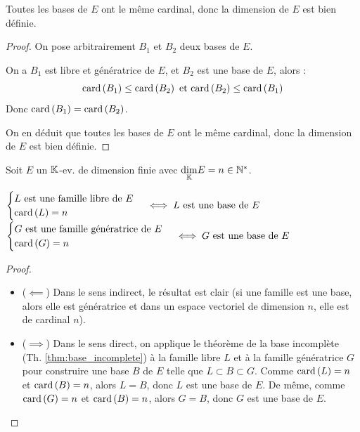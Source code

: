 \documentclass[12pt,a4paper]{report}
\begin{document}
\begin{theorem}
    Toutes les bases de $E$ ont le même cardinal, donc la dimension de $E$ est bien définie.
\end{theorem}

\begin{proof}
    On pose arbitrairement $B_1$ et $B_2$ deux bases de $E$.
    \begin{outline}
        \1 On a $B_1$ est libre et génératrice de $E$, et $B_2$ est une base de $E$, alors :
        $$\mathrm{card}\left(B_1\right) \le \mathrm{card}\left(B_2\right) \text{ et } \mathrm{card}\left(B_2\right) \le \mathrm{card}\left(B_1\right)$$
        \1 Donc $\mathrm{card}\left(B_1\right) = \mathrm{card}\left(B_2\right)$.
    \end{outline}
    On en déduit que toutes les bases de $E$ ont le même cardinal, donc la dimension de $E$ est bien définie.
\end{proof}

\begin{property}
    Soit $E$ un $\mathbb{K}$-ev. de dimension finie avec $\underset{\mathbb{K}}\dim E = n \in \mathbb{N}^*$.

    \begin{outline}[enumerate]
        \1 $\begin{cases}
        L \text{ est une famille libre de } E \\
        \mathrm{card}\left(L\right) = n
        \end{cases} \iff L \text{ est une base de } E$
        \1 $\begin{cases}
        G \text{ est une famille génératrice de } E \\
        \mathrm{card}\left(G\right) = n
        \end{cases} \iff G \text{ est une base de } E$
    \end{outline}

    \label{prop:base_iff_libre_card_dim}
\end{property}

\begin{proof}
    \begin{itemize}
        \item ($\impliedby$) Dans le sens indirect, le résultat est clair (si une famille est une base, alors elle est génératrice et dans un espace vectoriel de dimension $n$, elle est de cardinal $n$).
        \item ($\implies$) Dans le sens direct, on applique le théorème de la base incomplète (Th. \ref{thm:base_incomplete}) à la famille libre $L$ et à la famille génératrice $G$ pour construire une base $B$ de $E$ telle que $L \subset B \subset G$. Comme $\mathrm{card}\left(L\right) = n$ et $\mathrm{card}\left(B\right) = n$, alors $L = B$, donc $L$ est une base de $E$. De même, comme $\mathrm{card}\left(G\right) = n$ et $\mathrm{card}\left(B\right) = n$, alors $G = B$, donc $G$ est une base de $E$.
    \end{itemize}
\end{proof}
\end{document}

